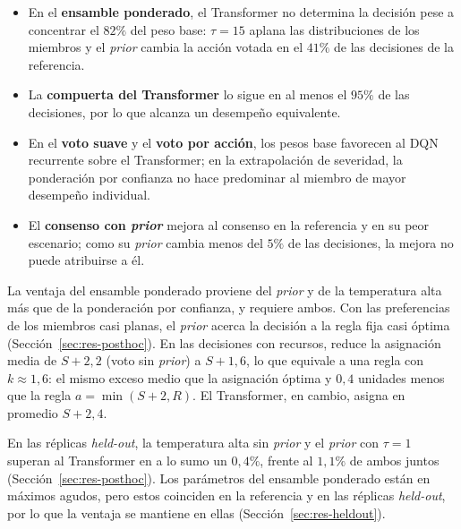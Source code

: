 \documentclass[../00_Main/Main.tex]{subfiles}
\begin{document}
\begin{itemize}
    \item En el \textbf{ensamble ponderado}, el Transformer no determina la
    decisi\'on pese a concentrar el $82\%$ del peso base: $\tau = 15$
    aplana las distribuciones de los miembros y el \emph{prior} cambia la
    acci\'on votada en el $41\%$ de las decisiones de la referencia.
    \item La \textbf{compuerta del Transformer} lo sigue en al menos el $95\%$ de las decisiones, por lo que alcanza un desempe\~no
    equivalente.
    \item En el \textbf{voto suave} y el \textbf{voto por acci\'on}, los
    pesos base favorecen al DQN recurrente sobre el Transformer; en la
    extrapolaci\'on de severidad, la ponderaci\'on por confianza no hace
    predominar al miembro de mayor desempe\~no individual.
    \item El \textbf{consenso con \emph{prior}} mejora al consenso en la
    referencia y en su peor escenario; como su \emph{prior} cambia menos
    del $5\%$ de las decisiones, la mejora no puede atribuirse a \'el.
\end{itemize}

La ventaja del ensamble ponderado proviene del \emph{prior} y de la
temperatura alta m\'as que de la ponderaci\'on por confianza, y requiere
ambos. Con las preferencias de los miembros casi planas, el \emph{prior}
acerca la decisi\'on a la regla fija casi \'optima
(Secci\'on~\ref{sec:res-posthoc}). En las decisiones con recursos, reduce
la asignaci\'on media de $S + 2{,}2$ (voto sin \emph{prior}) a
$S + 1{,}6$, lo que equivale a una regla con $k \approx 1{,}6$: el mismo
exceso medio que la asignaci\'on \'optima y $0{,}4$ unidades menos que la
regla $a = \min(S + 2, R)$. El Transformer, en cambio, asigna en promedio
$S + 2{,}4$.

En las r\'eplicas \emph{held-out}, la temperatura alta sin \emph{prior}
y el \emph{prior} con $\tau = 1$ superan al Transformer en a lo sumo un
$0{,}4\%$, frente al $1{,}1\%$ de ambos juntos
(Secci\'on~\ref{sec:res-posthoc}). Los par\'ametros del ensamble ponderado est\'an en m\'aximos
agudos, pero estos coinciden en la referencia y en las r\'eplicas
\emph{held-out}, por lo que la ventaja se mantiene en ellas
(Secci\'on~\ref{sec:res-heldout}).
\end{document}
